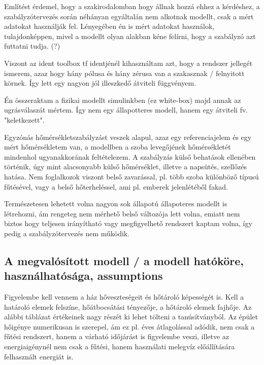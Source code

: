 Említést érdemel, hogy a szakirodalomban hogy állnak hozzá ehhez a kérdéshez, a szabályzótervezés során néhányan egyáltalán nem alkotnak modellt, csak a mért adatokat használják fel. Lényegében én is mért adatokat használok, tulajdonképpen, mivel a modellt olyan alakban kéne felírni, hogy a szabályzó azt futtatni tudja. (?)

Viszont az ident toolbox tf identjénél kihasználtam azt, hogy a rendszer jellegét ismerem, azaz hogy hány pólusa és hány zérusa van a szakasznak  / felnyitott körnek. Így lett egy nagyon jól illeszkedő átviteli függvényem.

Én összeraktam a fizikai modellt simulinkben (ez white-box) majd annak az ugrásválaszát mértem. Így nem egy állapotteres modell, hanem egy átviteli fv. "keletkezett".


Egyzónás hőmérsékletszabályzást veszek alapul, azaz egy referenciajelem és egy mért hőmérsékletem van, a modellben a szoba levegőjének hőmérsékletét mindenhol ugyanakkorának feltételezem. A szabályzás külső behatások ellenében történik, úgy mint alacsonyabb külső hőmérséklet, illetve a napsütés, szellőzés hatása. Nem foglalkozok viszont belső zavarással, pl. több szoba különböző típusú fűtésével, vagy a belső hőterheléssel, ami pl. emberek jelenlétéből fakad.

Természetesen lehetett volna nagyon sok állapotú állapoteres modellt is létrehozni, ám rengeteg nem mérhető belső változója lett volna, emiatt nem biztos hogy teljesen irányítható vagy megfigyelhető rendszert kaptam volna, így pedig a szabályzótervezés nem működik.





\subsection{A megvalósított modell / a modell hatóköre, használhatósága, assumptions}

Figyelembe kell vennem a ház hőveszteségeit és hőtároló képességét is.
Kell a határoló elemek felszíne, hőátbocsátási tényezője, a hőtároló elemek fajhője. Az alábbi táblázat értékeinek nagy részét ki lehet tölteni a tanúsítványból.
Az épület hőigénye numerikusan is szerepel, ám ez pl. éves átlagolással adódik, nem csak a fűtési rendszert, hanem a várható időjárást is figyelembe veszi, illetve az energiaigénynél nem csak a fűtési, hanem használati melegvíz előállítására felhasznált energiát is.

